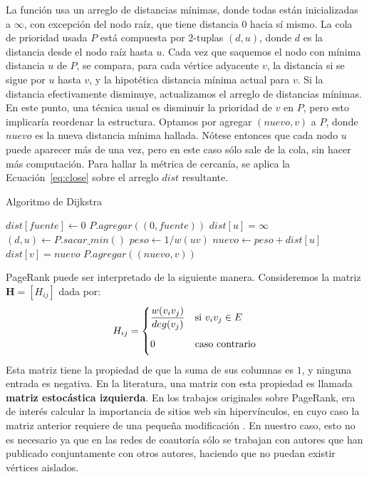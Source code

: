 \documentclass[journal]{IEEEtran}
\let\MYoriglatexcaption\caption
\renewcommand{\caption}[2][\relax]{\MYoriglatexcaption[#2]{#2}}
\newcommand{\matr}[1]{\mathbf{#1}} %
\begin{document}
La función  usa un arreglo de distancias mínimas, donde todas están inicializadas a \(\infty\), con excepción del nodo raíz, que tiene distancia \(0\) hacia sí mismo. La cola de prioridad usada \(P\) está compuesta por 2-tuplas \((d, u)\), donde \(d\) es la distancia desde el nodo raíz hasta \(u\). Cada vez que saquemos el nodo con mínima distancia \(u\) de \(P\), se compara, para cada vértice adyacente \(v\), la distancia si se sigue por \(u\) hasta \(v\), y la hipotética distancia mínima actual para \(v\). Si la distancia efectivamente disminuye, actualizamos el arreglo de distancias mínimas. En este punto, una técnica usual es disminuir la prioridad de \(v\) en \(P\)\cite{heap}, pero esto implicaría reordenar la estructura. Optamos por agregar \((nuevo, v)\) a \(P\), donde \(nuevo\) es la nueva distancia mínima hallada. Nótese entonces que cada nodo \(u\) puede aparecer más de una vez, pero en este caso sólo sale de la cola, sin hacer más computación. Para hallar la métrica de cercanía, se aplica la Ecuación~\ref{eq:close} sobre el arreglo \(dist\) resultante.
\begin{algorithm}[H]
	\caption{Algoritmo de Dijkstra} \label{alg:dijkstra}
\begin{algorithmic}
		\State $dist[fuente] \gets 0$
		\State $P.agregar((0, fuente))$
			\State $dist[u] = \infty$
		\EndFor
			\State $(d, u) \gets P.sacar\_min()$
					\State $peso \gets 1/w(uv)$
					\State $nuevo \gets peso + dist[u]$
						\State $dist[v] = nuevo$
						\State $P.agregar((nuevo, v))$
					\EndIf
				\EndFor
			\EndIf
		\EndWhile
	\EndFunction
\end{algorithmic}
\end{algorithm}

PageRank puede ser interpretado de la siguiente manera. Consideremos la matriz \(\matr{H} = [H_{ij}]\) dada por:
\begin{equation}
	H_{ij} =
	\begin{dcases}
	\frac{w(v_i v_j)}{deg(v_j)} &\text{si $v_i v_j \in E$}\\
	0\phantom{\frac{1}{|V|}} &\text{caso contrario}
	\end{dcases}
\end{equation}
Esta matriz tiene la propiedad de que la suma de sus columnas es \(1\), y ninguna entrada es negativa. En la literatura, una matriz con esta propiedad es llamada \textbf{matriz estocástica izquierda}. En los trabajos originales sobre PageRank, era de interés calcular la importancia de sitios web sin hipervínculos, en cuyo caso la matriz anterior requiere de una pequeña modificación \cite{google}. En nuestro caso, esto no es necesario ya que en las redes de coautoría sólo se trabajan con autores que han publicado conjuntamente con otros autores, haciendo que no puedan existir vértices aislados.
\end{document}
